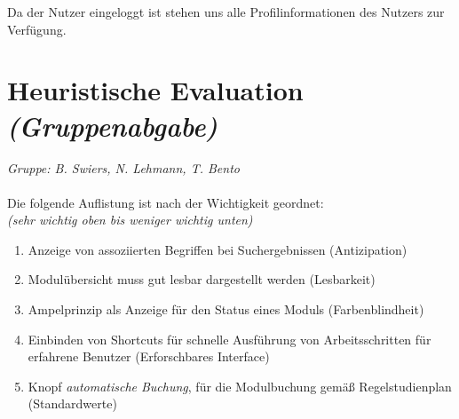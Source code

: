 \documentclass{article}
\begin{document}
Da der Nutzer eingeloggt ist stehen uns alle Profilinformationen des Nutzers zur Verfügung.

\section{Heuristische Evaluation \textit{(Gruppenabgabe)}}

\textit{Gruppe: B. Swiers, N. Lehmann, T. Bento}\\
\\
Die folgende Auflistung ist nach der Wichtigkeit geordnet:\\
\textit{(sehr wichtig oben bis weniger wichtig unten)}
\begin{enumerate}
\item Anzeige von assoziierten Begriffen bei Suchergebnissen (Antizipation)
\item Modulübersicht muss gut lesbar dargestellt werden (Lesbarkeit)
\item Ampelprinzip als Anzeige für den Status eines Moduls (Farbenblindheit)
\item Einbinden von Shortcuts für schnelle Ausführung von Arbeitsschritten für erfahrene Benutzer (Erforschbares Interface)
\item Knopf \textit{automatische Buchung}, für die Modulbuchung gemäß Regelstudienplan (Standardwerte) 
\end{enumerate}
  
\end{document}
